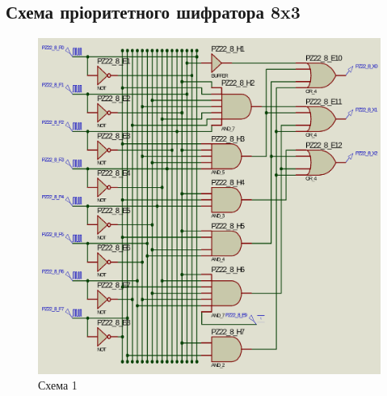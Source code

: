 \documentclass{article}
\begin{document}
\begin{normalsize}
	\section*{Схема пріоритетного шифратора 8x3}	
	\begin{figure}[H]
		\centering
		\includegraphics[scale=0.25]{s1}	
		\caption{Схема 1}
	\end{figure}


\end{normalsize}
\end{document}
